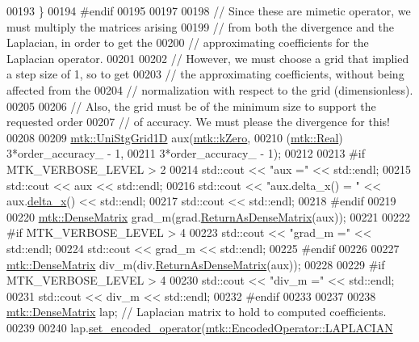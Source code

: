 \begin{DoxyCode}
00193   \}
00194 \textcolor{preprocessor}{  #endif}
00195 
00197 
00198   \textcolor{comment}{// Since these are mimetic operator, we must multiply the matrices arising}
00199   \textcolor{comment}{// from both the divergence and the Laplacian, in order to get the}
00200   \textcolor{comment}{// approximating coefficients for the Laplacian operator.}
00201 
00202   \textcolor{comment}{// However, we must choose a grid that implied a step size of 1, so to get}
00203   \textcolor{comment}{// the approximating coefficients, without being affected from the}
00204   \textcolor{comment}{// normalization with respect to the grid (dimensionless).}
00205 
00206   \textcolor{comment}{// Also, the grid must be of the minimum size to support the requested order}
00207   \textcolor{comment}{// of accuracy. We must please the divergence for this!}
00208 
00209   \hyperlink{classmtk_1_1UniStgGrid1D}{mtk::UniStgGrid1D} aux(\hyperlink{group__c01-roots_ga59a451a5fae30d59649bcda274fea271}{mtk::kZero},
00210                         (\hyperlink{group__c01-roots_gac080bbbf5cbb5502c9f00405f894857d}{mtk::Real}) 3*order\_accuracy\_ - 1,
00211                         3*order\_accuracy\_ - 1);
00212 
00213 \textcolor{preprocessor}{  #if MTK\_VERBOSE\_LEVEL > 2}
00214   std::cout << \textcolor{stringliteral}{"aux ="} << std::endl;
00215   std::cout << aux << std::endl;
00216   std::cout << \textcolor{stringliteral}{"aux.delta\_x() = "} << aux.\hyperlink{classmtk_1_1UniStgGrid1D_a6e7173b01241632cf509496d66b9f74c}{delta\_x}() << std::endl;
00217   std::cout << std::endl;
00218 \textcolor{preprocessor}{  #endif}
00219 
00220   \hyperlink{classmtk_1_1DenseMatrix}{mtk::DenseMatrix} grad\_m(grad.\hyperlink{classmtk_1_1Grad1D_a77b2eddbe4ab03f469306c604d505b1a}{ReturnAsDenseMatrix}(aux));
00221 
00222 \textcolor{preprocessor}{  #if MTK\_VERBOSE\_LEVEL > 4}
00223   std::cout << \textcolor{stringliteral}{"grad\_m ="} << std::endl;
00224   std::cout << grad\_m << std::endl;
00225 \textcolor{preprocessor}{  #endif}
00226 
00227   \hyperlink{classmtk_1_1DenseMatrix}{mtk::DenseMatrix} div\_m(div.\hyperlink{classmtk_1_1Div1D_a213fddbaaf86e4840c6a9649b69c2d49}{ReturnAsDenseMatrix}(aux));
00228 
00229 \textcolor{preprocessor}{  #if MTK\_VERBOSE\_LEVEL > 4}
00230   std::cout << \textcolor{stringliteral}{"div\_m ="} << std::endl;
00231   std::cout << div\_m << std::endl;
00232 \textcolor{preprocessor}{  #endif}
00233 
00237 
00238   \hyperlink{classmtk_1_1DenseMatrix}{mtk::DenseMatrix} lap; \textcolor{comment}{// Laplacian matrix to hold to computed coefficients.}
00239 
00240   lap.\hyperlink{classmtk_1_1DenseMatrix_ac0f824b0fec88c4fb42e77b7550fb0d3}{set\_encoded\_operator}(\hyperlink{namespacemtk_ga9b50023bfb2692219d2915feade94f80a1c2d5f3f8e6cbb0c7b033c388c905d22}{mtk::EncodedOperator::LAPLACIAN}

\end{DoxyCode}
